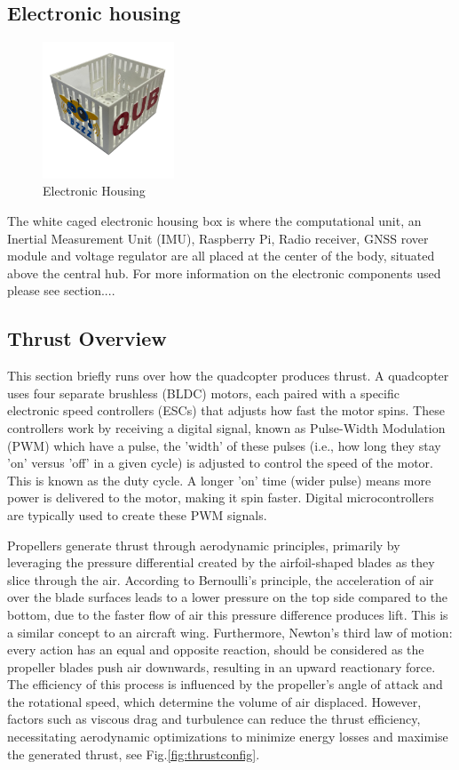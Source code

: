 \documentclass{article}
\begin{document}
\subsection*{Electronic housing}
\begin{figure}[H]
  \centering
  \includegraphics[width=0.35\textwidth]{Pictures/electronic_housing.png} 
  \caption{Electronic Housing}
  \label{fig:electronic_housing}
\end{figure}
The white caged electronic housing box is where the computational unit, an Inertial Measurement Unit (IMU), Raspberry Pi, Radio receiver, GNSS rover module and voltage regulator are all placed at the center of the body, situated above the central hub. For more information on the electronic components used please see section....
 
\subsection{Thrust Overview}
This section briefly runs over how the quadcopter produces thrust.
A quadcopter uses four separate brushless (BLDC) motors, each paired with a specific electronic speed controllers (ESCs) that adjusts how fast the motor spins. These controllers work by receiving a digital signal, known as Pulse-Width Modulation (PWM) which have a pulse, the 'width' of these pulses 
(i.e., how long they stay 'on' versus 'off' in a given cycle) is adjusted to control the speed of the motor. This is known as the duty cycle. A longer 'on' time (wider pulse) means more power is delivered to the motor, making it spin faster. Digital microcontrollers are typically used to create these PWM signals.

Propellers generate thrust through aerodynamic principles, primarily by leveraging the pressure differential created by the airfoil-shaped blades as they slice through the air. According to Bernoulli's principle, the acceleration of air over the blade surfaces leads to a lower pressure on the top side compared to the
bottom, due to the faster flow of air this pressure difference produces lift. This is a similar concept to an aircraft wing. Furthermore, Newton's third law of motion: every action has an equal and opposite reaction, should be considered as the propeller blades push air downwards, resulting in an upward reactionary force. 
The efficiency of this process is influenced by the propeller's angle of attack and the rotational speed, which determine the volume of air displaced. However, factors such as viscous drag and turbulence can reduce the thrust efficiency, necessitating aerodynamic optimizations to minimize energy losses and maximise 
the generated thrust, see Fig.\ref{fig:thrustconfig}.
\end{document}
